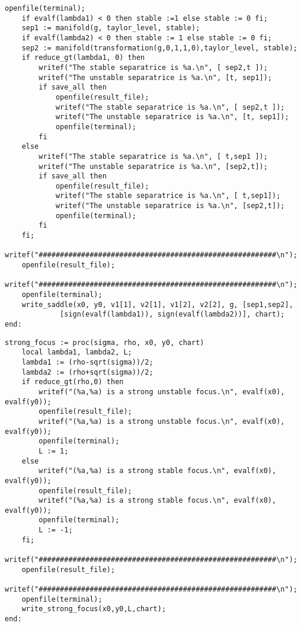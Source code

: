 \documentclass[a4paper,10pt]{article}
\begin{document}
\begin{lstlisting}[name=type]
    openfile(terminal);
    if evalf(lambda1) < 0 then stable :=1 else stable := 0 fi;
    sep1 := manifold(g, taylor_level, stable);
    if evalf(lambda2) < 0 then stable := 1 else stable := 0 fi;
    sep2 := manifold(transformation(g,0,1,1,0),taylor_level, stable);
    if reduce_gt(lambda1, 0) then
        writef("The stable separatrice is %a.\n", [ sep2,t ]);
        writef("The unstable separatrice is %a.\n", [t, sep1]);
        if save_all then
            openfile(result_file);
            writef("The stable separatrice is %a.\n", [ sep2,t ]);
            writef("The unstable separatrice is %a.\n", [t, sep1]);
            openfile(terminal);
        fi
    else
        writef("The stable separatrice is %a.\n", [ t,sep1 ]);
        writef("The unstable separatrice is %a.\n", [sep2,t]);
        if save_all then
            openfile(result_file);
            writef("The stable separatrice is %a.\n", [ t,sep1]);
            writef("The unstable separatrice is %a.\n", [sep2,t]);
            openfile(terminal);
        fi
    fi;
    writef("########################################################\n");
    openfile(result_file);
    writef("########################################################\n");
    openfile(terminal);
    write_saddle(x0, y0, v1[1], v2[1], v1[2], v2[2], g, [sep1,sep2],
             [sign(evalf(lambda1)), sign(evalf(lambda2))], chart);
end:
\end{lstlisting}

\begin{lstlisting}[name=type]
strong_focus := proc(sigma, rho, x0, y0, chart)
    local lambda1, lambda2, L;
    lambda1 := (rho-sqrt(sigma))/2;
    lambda2 := (rho+sqrt(sigma))/2;
    if reduce_gt(rho,0) then
        writef("(%a,%a) is a strong unstable focus.\n", evalf(x0), evalf(y0));
        openfile(result_file);
        writef("(%a,%a) is a strong unstable focus.\n", evalf(x0), evalf(y0));
        openfile(terminal);
        L := 1;
    else
        writef("(%a,%a) is a strong stable focus.\n", evalf(x0), evalf(y0));
        openfile(result_file);
        writef("(%a,%a) is a strong stable focus.\n", evalf(x0), evalf(y0));
        openfile(terminal);
        L := -1;
    fi;
    writef("########################################################\n");
    openfile(result_file);
    writef("########################################################\n");
    openfile(terminal);
    write_strong_focus(x0,y0,L,chart);
end:
\end{lstlisting}
\end{document}
